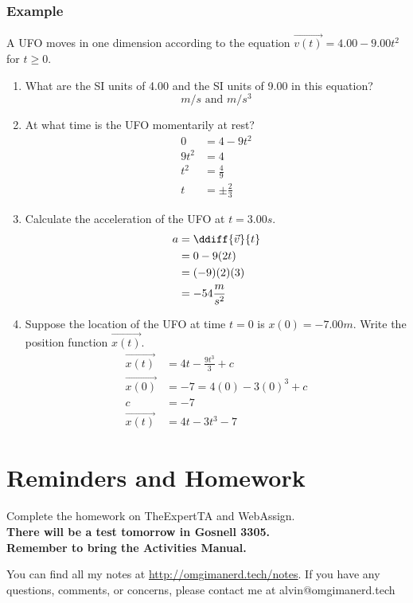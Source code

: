 \documentclass{math}
\begin{document}
\subsubsection*{Example}
A UFO moves in one dimension according to the equation \( \overrightarrow{v(t)}
= 4.00-9.00t^2 \) for \( t\ge 0 \).
\begin{enumerate}
  \item What are the SI units of 4.00 and the SI units of 9.00 in this equation?
  \[ m/s \text{ and } m/s^3 \]
  \item At what time is the UFO momentarily at rest?
  \begin{align*}
    0 &= 4-9t^2 \\
    9t^2 &= 4 \\
    t^2 &= \frac{4}{9} \\
    t &= \pm\frac{2}{3}
  \end{align*}
  \item Calculate the acceleration of the UFO at \( t = 3.00s \).
  \begin{align*}
    a &= \ddiff{\vec{v}}{t} \\
    &= 0-9(2t) \\
    &= (-9)(2)(3) \\
    &= -54\frac{m}{s^2}
  \end{align*}
  \item Suppose the location of the UFO at time \( t = 0 \) is \( x(0) = -7.00m
  \). Write the position function \( \overrightarrow{x(t)} \).
  \begin{align*}
    \overrightarrow{x(t)} &= 4t-\frac{9t^3}{3}+c \\
    \overrightarrow{x(0)} &= -7 = 4(0)-3(0)^3+c \\
    c &= -7 \\
    \overrightarrow{x(t)} &= 4t-3t^3-7
  \end{align*}
\end{enumerate}

\section*{Reminders and Homework}
Complete the homework on TheExpertTA and WebAssign. \\
\textbf{There will be a test tomorrow in Gosnell 3305.} \\
\textbf{Remember to bring the Activities Manual.} \\

\begin{center}
  You can find all my notes at \url{http://omgimanerd.tech/notes}. If you have
  any questions, comments, or concerns, please contact me at
  alvin@omgimanerd.tech
\end{center}
\end{document}
